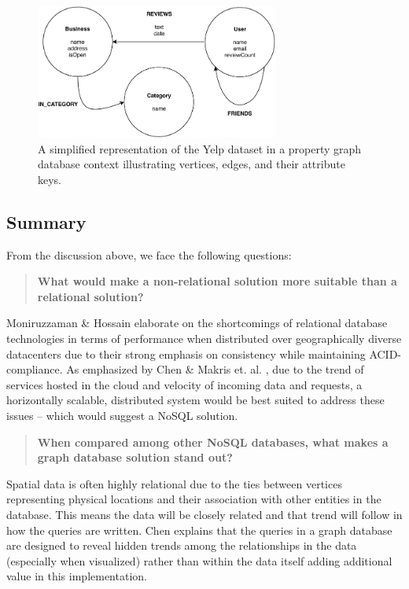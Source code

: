 \begin{figure}[h]
    \centering
    \includegraphics[width=8cm]{img/3_litReviewFigures/graphDb.pdf}
    \caption{A simplified representation of the Yelp dataset in a property graph database context illustrating vertices, edges, and their attribute keys.}
    \label{fig:graphDb}
\end{figure}

\subsection{Summary}

From the discussion above, we face the following questions:

\begin{quote}
    \textbf{What would make a non-relational solution more suitable than a relational solution?}
\end{quote}

Moniruzzaman \& Hossain \cite{nosqlDb} elaborate on the shortcomings of relational database technologies in terms of performance when distributed over geographically diverse datacenters due to their strong emphasis on consistency while maintaining ACID-compliance. As emphasized by Chen \cite{socialData} \& Makris et. al. \cite{mongoVsPostgres}, due to the trend of services hosted in the cloud and velocity of incoming data and requests, a horizontally scalable, distributed system would be best suited to address these issues -- which would suggest a NoSQL solution.

\begin{quote}
    \textbf{When compared among other NoSQL databases, what makes a graph database solution stand out?}
\end{quote}

Spatial data is often highly relational due to the ties between vertices representing physical locations and their association with other entities in the database. This means the data will be closely related and that trend will follow in how the queries are written. Chen \cite{socialData} explains that the queries in a graph database are designed to reveal hidden trends among the relationships in the data (especially when visualized) rather than within the data itself adding additional value in this implementation.

